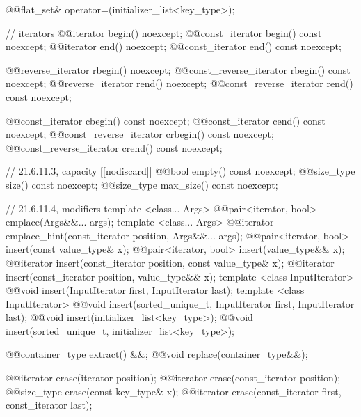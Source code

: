 \begin{codeblock}
{{    @@flat_set& operator=(initializer_list<key_type>);

    // iterators
    @@iterator               begin() noexcept;
    @@const_iterator         begin() const noexcept;
    @@iterator               end() noexcept;
    @@const_iterator         end() const noexcept;

    @@reverse_iterator       rbegin() noexcept;
    @@const_reverse_iterator rbegin() const noexcept;
    @@reverse_iterator       rend() noexcept;
    @@const_reverse_iterator rend() const noexcept;

    @@const_iterator         cbegin() const noexcept;
    @@const_iterator         cend() const noexcept;
    @@const_reverse_iterator crbegin() const noexcept;
    @@const_reverse_iterator crend() const noexcept;

    // 21.6.11.3, capacity
    [[nodiscard]] @@bool empty() const noexcept;
    @@size_type size() const noexcept;
    @@size_type max_size() const noexcept;

    // 21.6.11.4, modifiers
    template <class... Args> @@pair<iterator, bool> emplace(Args&&... args);
    template <class... Args>
      @@iterator emplace_hint(const_iterator position, Args&&... args);
    @@pair<iterator, bool> insert(const value_type& x);
    @@pair<iterator, bool> insert(value_type&& x);
    @@iterator insert(const_iterator position, const value_type& x);
    @@iterator insert(const_iterator position, value_type&& x);
    template <class InputIterator>
      @@void insert(InputIterator first, InputIterator last);
    template <class InputIterator>
      @@void insert(sorted_unique_t, InputIterator first, InputIterator last);
    @@void insert(initializer_list<key_type>);
    @@void insert(sorted_unique_t, initializer_list<key_type>);

    @@container_type extract() &&;
    @@void replace(container_type&&);

    @@iterator erase(iterator position);
    @@iterator erase(const_iterator position);
    @@size_type erase(const key_type& x);
    @@iterator erase(const_iterator first, const_iterator last);

}}
\end{codeblock}
